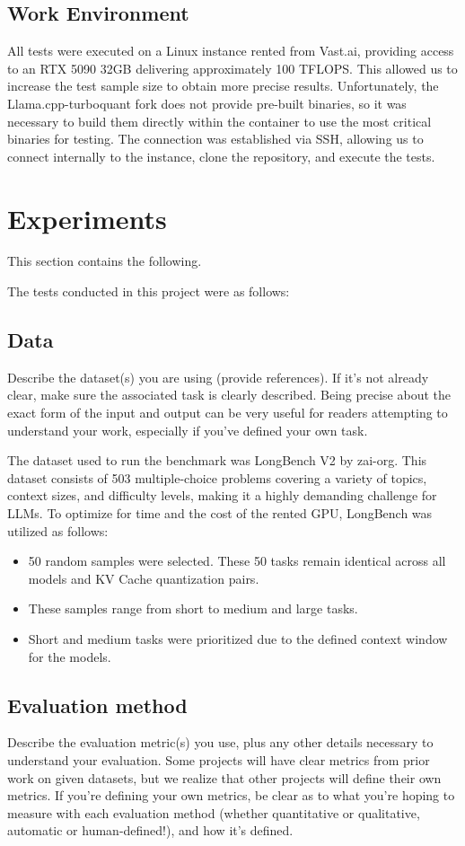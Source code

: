 \documentclass{article}
\begin{document}
\subsection{Work Environment}
All tests were executed on a Linux instance rented from Vast.ai, providing access to an RTX 5090 32GB delivering approximately 100 TFLOPS.
This allowed us to increase the test sample size to obtain more precise results.
Unfortunately, the Llama.cpp-turboquant fork does not provide pre-built binaries, so it was necessary to build them directly within the container to use the most critical binaries for testing.
The connection was established via SSH, allowing us to connect internally to the instance, clone the repository, and execute the tests.


\section{Experiments}
This section contains the following.

The tests conducted in this project were as follows:

\subsection{Data}
Describe the dataset(s) you are using (provide references). If it's not already clear, make sure the associated task is clearly described.
Being precise about the exact form of the input and output can be very useful for readers attempting to understand your work, especially if you've defined your own task.

The dataset used to run the benchmark was LongBench V2 by zai-org.
This dataset consists of 503 multiple-choice problems covering a variety of topics, context sizes, and difficulty levels, making it a highly demanding challenge for LLMs.
To optimize for time and the cost of the rented GPU, LongBench was utilized as follows:
\begin{itemize}
  \item 50 random samples were selected. These 50 tasks remain identical across all models and KV Cache quantization pairs.
  \item These samples range from short to medium and large tasks.
  \item Short and medium tasks were prioritized due to the defined context window for the models.
\end{itemize}

\subsection{Evaluation method}
Describe the evaluation metric(s) you use, plus any other details necessary to understand your evaluation.
Some projects will have clear metrics from prior work on given datasets, but we realize that other projects will define their own metrics.
If you're defining your own metrics, be clear as to what you're hoping to measure with each evaluation method (whether quantitative or qualitative, automatic or human-defined!), and how it's defined.
\end{document}
